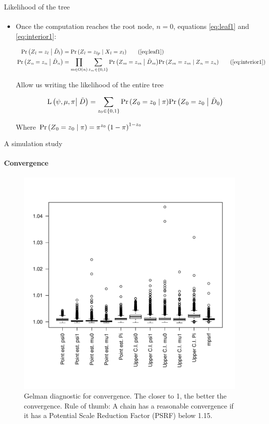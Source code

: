 \documentclass[9pt,handout,ignorenonframetext,]{beamer}
\newcommand{\Prcond}[2]{{\mbox{Pr}\left(#1\vphantom{#2}\;\right|\left.\vphantom{#1}#2\right)}}
\newcommand{\likelihood}[2]{\mbox{L}\left(#1\vphantom{#2}\right|\left.\vphantom{#1}#2\right)}
\newcommand{\aphylo}{D{}}      %
\newcommand{\aphyloObs}{\tilde \aphylo{}} %
\newcommand{\Ann}{Z{}} %
\newcommand{\ann}{z{}} %
\newcommand{\AnnObs}{X{}}
\newcommand{\annObs}{x{}}
\begin{document}
\begin{frame}[t,label=likelihood]{Likelihood of the tree}

\framesubtitle{\hyperlink{peelingalgorithm}{}}

\begin{itemize}
\item
  Once the computation reaches the root node, \(n=0\), equations
  \eqref{eq:leaf1} and \eqref{eq:interior1}:

  \tiny

  \begin{align*}
  \Prcond{\Ann_l = \ann_l}{\aphyloObs_l} & = \Prcond{\Ann_{l} = \ann_{lp}}{\AnnObs_{l} = \annObs_{l}} \tag{\ref{eq:leaf1}}\\
  \Prcond{\Ann_n = \ann_n}{\aphyloObs_n}  & = 
  \prod_{m \in O(n)} \sum_{\ann_m \in \{0,1\}} \Prcond{\Ann_m = \ann_m}{\aphyloObs_m}  
  \Prcond{\Ann_{m} = \ann_{m}}{\Ann_{n} = \ann_{n}} \tag{\ref{eq:interior1}}
  \end{align*}

  \normalsize

  Allow us writing the likelihood of the entire tree

  \begin{equation}
  \label{eq:l}
  \likelihood{\psi, \mu, \pi}{\aphyloObs} = \sum_{\ann_0\in\{0,1\}}\Prcond{\Ann_0=\ann_0}{\pi}\Prcond{\Ann_0=\ann_0}{\aphyloObs_0}
  \end{equation}

  Where
  \(\Prcond{\Ann_0=\ann_0}{\pi} = \pi^{\ann_{0}}\left(1 - \pi\right)^{1 - \ann_{0}}\)
\end{itemize}

\end{frame}

\begin{frame}[t,label=sim-convergence]{A simulation study}

\framesubtitle{Convergence \hyperlink{sim-setup}{}}

\begin{figure}
\centering
\includegraphics[width=.6\linewidth, trim={0 1.5cm 0 2cm},clip]{gelmans_right_prior.pdf}
\caption{Gelman diagnostic for convergence. The closer to 1, the better the convergence. Rule of thumb: A chain has a reasonable convergence if it has a Potential Scale Reduction Factor (PSRF) below 1.15.}
\end{figure}

\end{frame}
\end{document}
